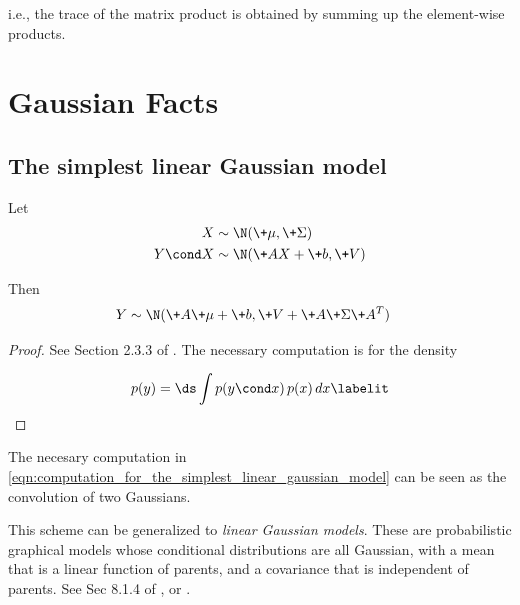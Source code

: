 \documentclass{article} %
\begin{document}
i.e.,  the trace of the matrix product is obtained by summing up the element-wise products. 


\section{Gaussian Facts}

\subsection{The simplest linear Gaussian model}

\begin{proposition}
\label{prop:simplest_linear_gaussian_model}
Let
\begin{align*}
X &\sim \N(\+\mu,  \+\Sigma) \\
Y \cond X &\sim \N(\+AX+\+b,  \+V) \\
\end{align*}

Then
\begin{align*}
Y &\sim \N(\+A \+\mu + \+b,  \+V + \+A \+\Sigma \+A^T)
\end{align*}
\end{proposition}

\begin{proof}
See Section 2.3.3 of \cite{bishop2006pattern}.    The necessary computation is for the density

\begin{align*}
p(y)  = \ds\int p(y \cond x) \,  p(x) \,  dx
\labelit \label{eqn:computation_for_the_simplest_linear_gaussian_model}
\end{align*}
\end{proof}


\begin{remark}
The necesary computation in \eqref{eqn:computation_for_the_simplest_linear_gaussian_model} can be seen as the convolution of two Gaussians.
\end{remark}


\begin{remark}
This scheme can be generalized to \textit{linear Gaussian models}.  These are probabilistic graphical models whose conditional distributions are all Gaussian,  with a mean that is a linear function of parents,  and a covariance that is independent of parents.   See Sec 8.1.4 of \cite{bishop2006pattern}, or \cite{roweis1999unifying}.   
\end{remark}
\end{document}
